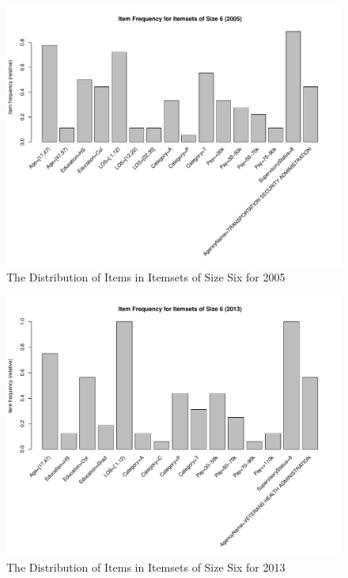 \documentclass{article}
\begin{document}
    \begin{center}
        \begin{figure}
            \includegraphics[scale=0.4]{./images/item-freq-2005.pdf}
            \caption{The Distribution of Items in Itemsets of Size Six for 2005}
            \label{fig:2}
        \end{figure}
    \end{center}

    \begin{center}
        \begin{figure}
            \includegraphics[scale=0.4]{./images/item-freq-2013.pdf}
            \caption{The Distribution of Items in Itemsets of Size Six for 2013}
            \label{fig:3}
        \end{figure}
    \end{center}
\end{document}
